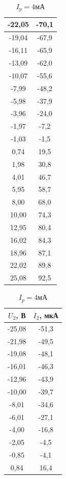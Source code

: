 \documentclass[a4paper]{article}
\begin{document}
\begin{table}[!h]
\begin{floatrow}
{\begin{tabular}{|c|c|}
-22,05  & -70,1     \\ \hline
-19,04  & -67,9     \\ \hline
-16,11  & -65,9     \\ \hline
-13,09  & -62,0       \\ \hline
-10,07  & -55,6     \\ \hline
-7,99   & -48,2     \\ \hline
-5,98   & -37,9     \\ \hline
-3,96   & -24,0       \\ \hline
-1,97   & -7,2      \\ \hline
-1,03   & -1,5      \\ \hline
0,74    & 19,5      \\ \hline
1,98    & 30,8      \\ \hline
4,01    & 46,7      \\ \hline
5,95    & 58,7      \\ \hline
8,00       & 68,0        \\ \hline
10,00      & 74,3      \\ \hline
12,95   & 80,4      \\ \hline
16,02   & 84,3      \\ \hline
18,96   & 87,1      \\ \hline
22,02   & 89,8      \\ \hline
25,08   & 92,5      \\ \hline
\end{tabular}
\caption{$I_p = 4$мА}
           }
   \ttabbox[\FBwidth]{}%
           {
\begin{tabular}{|c|c|}
\hline
$U_2$, В &$ I_2$, мкА \\ \hline
-25,08  & -51,3     \\ \hline
-21,98  & -49,5     \\ \hline
-19,08  & -48,1       \\ \hline
-16,01  & -46,3     \\ \hline
-12,96  & -43,9     \\ \hline
-10,00     & -39,7     \\ \hline
-8,01   & -34,6     \\ \hline
-6,01   & -27,1     \\ \hline
-4,00      & -16,8     \\ \hline
-2,05   & -4,5      \\ \hline
-0,85   & -4,1        \\ \hline
0,84    & 16,4      \\ \hline

\end{tabular}}
\end{floatrow}
\end{table}
\end{document}
